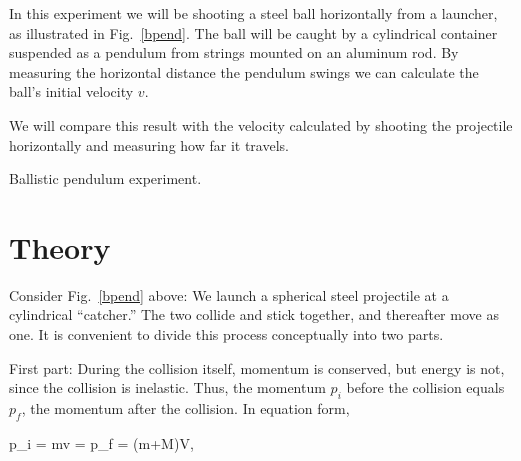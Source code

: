 In this experiment we will be shooting a steel ball horizontally from
a launcher, as illustrated in Fig.~\ref{bpend}.  The ball will be
caught by a cylindrical container suspended as a pendulum from strings
mounted on an aluminum rod.  By measuring the horizontal distance the
pendulum swings we can calculate the ball's initial velocity $v$.

We will compare this result with the velocity calculated by shooting
the projectile horizontally and measuring how far it travels.


\bfig[h]
\begin{center}
{}
\end{center}
\caption{Ballistic pendulum experiment. \label{bpend}}
\efig

\section*{Theory}

Consider Fig.~\ref{bpend} above:  We launch a
spherical steel projectile
at a cylindrical ``catcher.''  The two collide and stick together, and
thereafter move as one.  It is convenient to divide this process
conceptually into two parts.

First part: During the collision itself, momentum is conserved, but
energy is not, since the collision is inelastic.  Thus, the momentum
$p_{i}$ before the collision equals $p_{f}$, the momentum after the
collision.  In equation form,

\beq
p_{i} = mv = p_{f} = (m+M)V, \label{pi=pf}
\eeq

